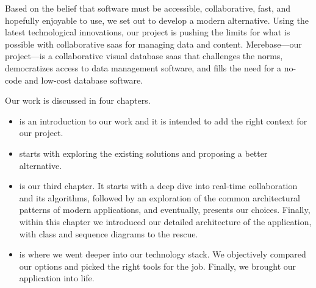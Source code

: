 Based on the belief that software must be accessible, collaborative, fast, and hopefully enjoyable to use, we set out to develop a modern alternative. Using the latest technological innovations, our project is pushing the limits for what is possible with collaborative \acrshort{saas} for managing data and content. Merebase---our project---is a collaborative visual database \acrshort{saas} that challenges the norms, democratizes access to data management software, and fills the need for a no-code and low-cost database software.

Our work is discussed in four chapters.
\begin{itemize}
	\item {} is an introduction to our work and it is intended to add the right context for our project.
	\item {} starts with exploring the existing solutions and proposing a better alternative.
	\item {} is our third chapter. It starts with a deep dive into real-time collaboration and its algorithms, followed by an exploration of the common architectural patterns of modern applications, and eventually, presents our choices. Finally, within this chapter we introduced our detailed architecture of the application, with class and sequence diagrams to the rescue.
	\item {} is where we went deeper into our technology stack. We objectively compared our options and picked the right tools for the job. Finally, we brought our application into life.
\end{itemize}